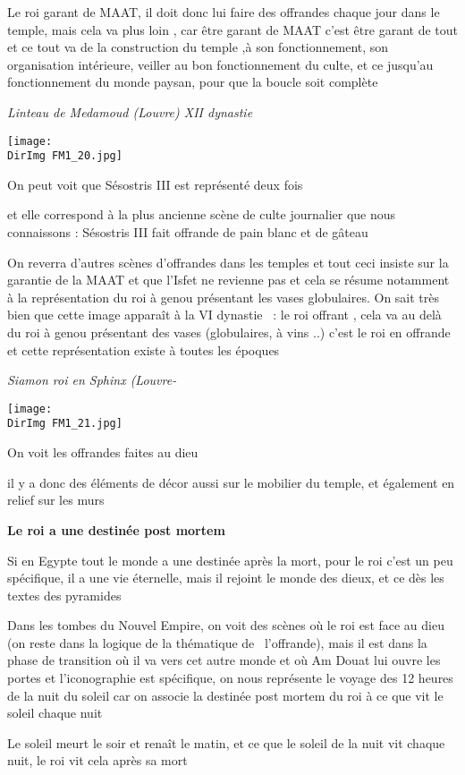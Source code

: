\documentclass[a4paper]{article}
\newcommand{\DirImg}{../img/FaivreMartin/}
\begin{document}
Le roi garant de MAAT, il doit donc lui faire des offrandes chaque jour dans le temple, mais cela va plus loin , car
être garant de MAAT c'est être garant de tout et ce tout va de la construction du temple ,à son fonctionnement, son
organisation intérieure, veiller au bon fonctionnement du culte, et ce jusqu'au fonctionnement du monde paysan, pour
que la boucle soit complète


\textit{Linteau de Medamoud (Louvre) XII dynastie}


\texttt{[image: \\DirImg FM1\_20.jpg]} 


On peut voit que Sésostris III est représenté deux fois

et elle correspond à la plus ancienne scène de culte journalier que nous connaissons : Sésostris III fait offrande de
pain blanc et de gâteau


On reverra d'autres scènes d'offrandes dans les temples et tout ceci insiste sur la garantie de la MAAT et que l'Isfet
ne revienne pas et cela se résume notamment à la représentation du roi à genou présentant les vases globulaires. On
sait très bien que cette image apparaît à la VI dynastie \ : le roi offrant , cela va au delà du roi à genou présentant
des vases (globulaires, à vins ..) c'est le roi en offrande et cette représentation existe à toutes les époques


\textit{Siamon roi en Sphinx (Louvre-}

\texttt{[image: \\DirImg FM1\_21.jpg]}


On voit les offrandes faites au dieu


il y a donc des éléments de décor aussi sur le mobilier du temple, et également en relief sur les murs


\textbf{Le roi a une destinée post mortem}


Si en Egypte tout le monde a une destinée après la mort, pour le roi c'est un peu spécifique, il a une vie éternelle,
mais il rejoint le monde des dieux, et ce dès les textes des pyramides


Dans les tombes du Nouvel Empire, on voit des scènes où le roi est face au dieu (on reste dans la logique de la
thématique de \ l'offrande), mais il est dans la phase de transition où il va vers cet autre monde et où Am Douat lui
ouvre les portes et l'iconographie est spécifique, on nous représente le voyage des 12 heures de la nuit du soleil car
on associe la destinée post mortem du roi à ce que vit le soleil chaque nuit

Le soleil meurt le soir et renaît le matin, et ce que le soleil de la nuit vit chaque nuit, le roi vit cela après sa
mort
\end{document}

